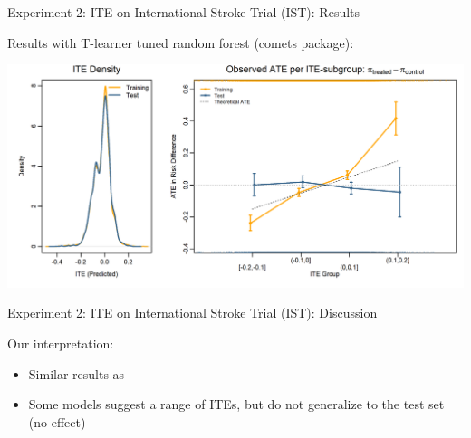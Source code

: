 \documentclass[onlytextwidth,english]{beamer}\usepackage[]{graphicx}\usepackage[]{xcolor}
\begin{document}
\begin{frame}{Experiment 2: ITE on International Stroke Trial (IST): Results}

Results with T-learner tuned random forest (comets package):

\includegraphics[width=\textwidth]{img/Experiment2/IST_tuned_rf_tlearner_density_ITE_ATE.png}

\end{frame}



\begin{frame}{Experiment 2: ITE on International Stroke Trial (IST): Discussion}

Our interpretation:

\begin{itemize}
    \item Similar results as \citet{chen2025}
    \item Some models suggest a range of ITEs, but do not generalize to the test set (no effect)
\end{itemize}

\end{frame}



% 
% 
% 
% 
% 
% 
% 
% 
% 
% 
% 
% 
% 
% 
% 
% 
% 
% 
% 
% 
% 
% 
% 
% 
% 
% 
% 
% 
% 
% 
% 
% 
% 
% 
% 
% 
% 
% 
% 
% 
% 
% 
\end{document}
